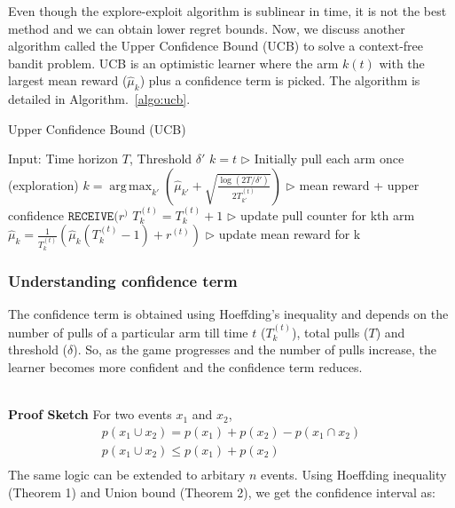 \documentclass[11pt]{article}
\DeclareMathOperator*{\argmax}{arg\,max}
\begin{document}
Even though the explore-exploit algorithm is sublinear in time, it is not the best method and we can obtain lower regret bounds. Now, we discuss another algorithm called the Upper Confidence Bound (UCB) to solve a context-free bandit problem. UCB is an optimistic learner where the arm $k(t)$ with the largest mean reward ($\hat{\mu}_{k}$) plus a confidence term is picked. The algorithm is detailed in Algorithm.~\ref{algo:ucb}.

\begin{algorithm}[H]
\caption{Upper Confidence Bound (UCB) }
\label{algo:ucb}
\begin{algorithmic}[1]
\STATE Input: Time horizon $T$, Threshold $\delta'$
\STATE $k = t$ \hfill $\triangleright$ Initially pull each arm once (exploration)
\ELSE
\STATE $k = \argmax_{k'} \left(\hat{\mu}_{k'
} + \sqrt{\frac{\log(2T/\delta')}{2T_{k'}^{(t)}}} \right)$ \hfill $\triangleright$ mean reward + upper confidence
\ENDIF
\STATE $\mathtt{RECEIVE}(r^)$
\STATE $T_k^{(t)} = T_k^{(t)} + 1$  \hfill $\triangleright$ update pull counter for kth arm
\STATE $\hat{\mu}_{k} = \frac{1}{T_k^{(t)}}\left(\hat{\mu}_{k}(T_k^{(t)} - 1) + r^{(t)}\right)$ \hfill $\triangleright$ update mean reward for k
\ENDFOR
\end{algorithmic}
\end{algorithm}

\subsubsection{Understanding confidence term}
The confidence term is obtained using Hoeffding's inequality and depends on the number of pulls of a particular arm till time $t$ ($T_{k}^{(t)}$), total pulls ($T$) and threshold ($\delta$). So, as the game progresses and the number of pulls increase, the learner becomes more confident and the confidence term reduces.

\\


\normalfont\textbf{Proof Sketch} For two events $x_1$ and $x_2$, 
\begin{align*}
    p(x_1 \cup x_2) = p(x_1) + p(x_2) - p(x_1 \cap x_2)\\
p(x_1 \cup x_2) \le p(x_1) + p(x_2)\\
\end{align*}
The same logic can be extended to arbitary $n$ events. Using Hoeffding inequality (Theorem 1) and Union bound (Theorem 2), we get the confidence interval as:
\end{document}
